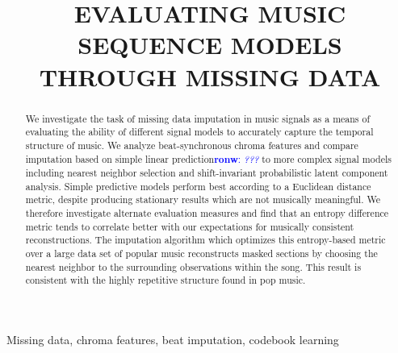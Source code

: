\documentclass{article}
\title{EVALUATING MUSIC SEQUENCE MODELS THROUGH MISSING DATA}
\newcommand{\FIXME}[2][FIXME]{\textcolor{blue}{\textbf{#1}: \emph{#2}}}
\begin{document}
\ninept
%
\maketitle
%
\begin{abstract}
  We investigate the task of missing data imputation in music signals
  as a means of evaluating the ability of different signal models to
  accurately capture the temporal structure of music.
  We analyze beat-synchronous chroma features and compare imputation
  based on simple linear prediction\FIXME[ronw]{???} to more complex
  signal models including nearest neighbor selection and
  shift-invariant probabilistic latent component analysis.
  Simple predictive models perform best according to a Euclidean
  distance metric, despite producing stationary results which are not
  musically meaningful.  We therefore investigate alternate evaluation
  measures %
  and find that an entropy difference %
  metric tends to correlate
  better with our %
  expectations for musically consistent reconstructions.
  The imputation algorithm which optimizes this entropy-based metric over a
  large data set of popular music reconstructs masked sections by
  choosing the nearest neighbor to the surrounding observations within
  the song.
  This result is consistent with the highly repetitive structure 
  found in pop music.
\end{abstract}
%
\begin{keywords}
Missing data, chroma features, beat imputation, codebook learning
\end{keywords}
%

\end{document}
